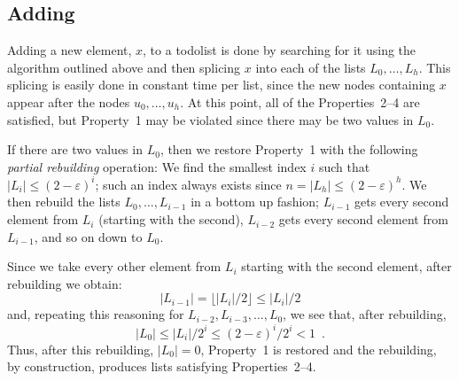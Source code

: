 \documentclass{patmorin}
\newcommand{\eps}{\varepsilon}
\begin{document}
\vspace{1ex}
\begin{algorithmic}
    \ENDIF
  \ENDFOR
\end{algorithmic}

\subsection{Adding}

Adding a new element, $x$, to a todolist is done by searching for it
using the algorithm outlined above and then splicing $x$ into each of
the lists $L_0,\ldots,L_h$.  This splicing is easily done in constant
time per list, since the new nodes containing $x$ appear after the nodes
$u_0,\ldots,u_h$.  At this point, all of the Properties~2--4 are satisfied,
but Property~1 may be violated since there may be two values in $L_0$.

If there are two values in $L_0$, then we restore Property~1 with the
following \emph{partial rebuilding} operation: We find the smallest index
$i$ such that $|L_i|\le (2-\eps)^i$; such an index always exists since
$n=|L_h|\le(2-\eps)^h$.  We then rebuild the lists $L_{0},\ldots,L_{i-1}$
in a bottom up fashion; $L_{i-1}$ gets every second element from $L_i$
(starting with the second), $L_{i-2}$ gets every second element from
$L_{i-1}$, and so on down to $L_0$.

Since we take every other element from $L_i$ starting with the second element,
after rebuilding we obtain:
\[
   |L_{i-1}| = \lfloor |L_i|/2 \rfloor \le |L_i|/2
\]
and, repeating this reasoning for $L_{i-2}, L_{i-3},\ldots, L_0$, we see that, after rebuilding,
\[
   |L_{0}| \le |L_i|/2^i \le (2-\eps)^i/2^i < 1 \enspace .
\]
Thus, after this rebuilding, $|L_0|=0$, Property~1 is restored and the
rebuilding, by construction, produces lists satisfying Properties~2--4.
\end{document}
